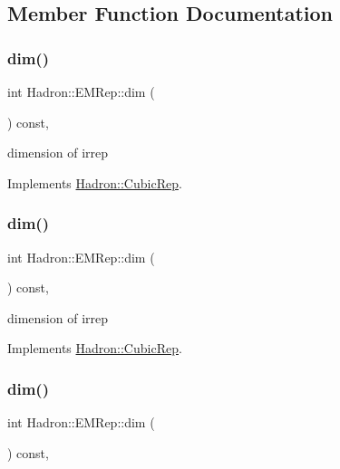 \subsection{Member Function Documentation}
\mbox{\label{structHadron_1_1EMRep_ae77e0d4cd20a7b659270f04e46f79ad8}} 
\subsubsection{\texorpdfstring{dim()}{dim()}\hspace{0.1cm}{\footnotesize\ttfamily [1/3]}}
{\footnotesize\ttfamily int Hadron\+::\+E\+M\+Rep\+::dim (\begin{DoxyParamCaption}{ }\end{DoxyParamCaption}) const\hspace{0.3cm}{\ttfamily [inline]}, {\ttfamily [virtual]}}

dimension of irrep 

Implements \mbox{\hyperlink{structHadron_1_1CubicRep_ac178d14064f037a66af4b9fb4b312d51}{Hadron\+::\+Cubic\+Rep}}.

\mbox{\label{structHadron_1_1EMRep_ae77e0d4cd20a7b659270f04e46f79ad8}} 
\subsubsection{\texorpdfstring{dim()}{dim()}\hspace{0.1cm}{\footnotesize\ttfamily [2/3]}}
{\footnotesize\ttfamily int Hadron\+::\+E\+M\+Rep\+::dim (\begin{DoxyParamCaption}{ }\end{DoxyParamCaption}) const\hspace{0.3cm}{\ttfamily [inline]}, {\ttfamily [virtual]}}

dimension of irrep 

Implements \mbox{\hyperlink{structHadron_1_1CubicRep_ac178d14064f037a66af4b9fb4b312d51}{Hadron\+::\+Cubic\+Rep}}.

\mbox{\label{structHadron_1_1EMRep_ae77e0d4cd20a7b659270f04e46f79ad8}} 
\subsubsection{\texorpdfstring{dim()}{dim()}\hspace{0.1cm}{\footnotesize\ttfamily [3/3]}}
{\footnotesize\ttfamily int Hadron\+::\+E\+M\+Rep\+::dim (\begin{DoxyParamCaption}{ }\end{DoxyParamCaption}) const\hspace{0.3cm}{\ttfamily [inline]}, {\ttfamily [virtual]}}

